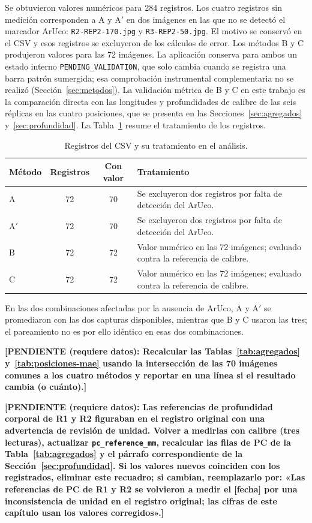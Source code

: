 \documentclass{report}
\newcommand{\Aprime}{A$'$}
\newcommand{\pendiente}[1]{\par\textbf{[PENDIENTE (requiere datos): #1]}\par}
\begin{document}
Se obtuvieron valores numéricos para 284 registros. Los cuatro registros sin medición corresponden a A y \Aprime{} en dos imágenes en las que no se detectó el marcador ArUco: \texttt{R2-REP2-170.jpg} y \texttt{R3-REP2-50.jpg}. El motivo se conservó en el CSV y esos registros se excluyeron de los cálculos de error. Los métodos B y C produjeron valores para las 72 imágenes. La aplicación conserva para ambos un estado interno \texttt{PENDING\_VALIDATION}, que solo cambia cuando se registra una barra patrón sumergida; esa comprobación instrumental complementaria no se realizó (Sección~\ref{sec:metodos}). La validación métrica de B y C en este trabajo es la comparación directa con las longitudes y profundidades de calibre de las seis réplicas en las cuatro posiciones, que se presenta en las Secciones~\ref{sec:agregados} y~\ref{sec:profundidad}. La Tabla~\ref{tab:registros} resume el tratamiento de los registros.

\begin{table}[htbp]

\caption{Registros del CSV y su tratamiento en el análisis.}
\label{tab:registros}
\begin{tabular}{@{}lccp{7.5cm}@{}}
\hline
Método & Registros & Con valor & Tratamiento \\
\hline
A & 72 & 70 & Se excluyeron dos registros por falta de detección del ArUco. \\
\Aprime & 72 & 70 & Se excluyeron dos registros por falta de detección del ArUco. \\
B & 72 & 72 & Valor numérico en las 72 imágenes; evaluado contra la referencia de calibre. \\
C & 72 & 72 & Valor numérico en las 72 imágenes; evaluado contra la referencia de calibre. \\
\hline
\end{tabular}
\end{table}

En las dos combinaciones afectadas por la ausencia de ArUco, A y \Aprime{} se promediaron con las dos capturas disponibles, mientras que B y C usaron las tres; el pareamiento no es por ello idéntico en esas dos combinaciones. \pendiente{Recalcular las Tablas~\ref{tab:agregados} y~\ref{tab:posiciones-mae} usando la intersección de las 70 imágenes comunes a los cuatro métodos y reportar en una línea si el resultado cambia (o cuánto).}

\pendiente{Las referencias de profundidad corporal de R1 y R2 figuraban en el registro original con una advertencia de revisión de unidad. Volver a medirlas con calibre (tres lecturas), actualizar \texttt{pc\_reference\_mm}, recalcular las filas de PC de la Tabla~\ref{tab:agregados} y el párrafo correspondiente de la Sección~\ref{sec:profundidad}. Si los valores nuevos coinciden con los registrados, eliminar este recuadro; si cambian, reemplazarlo por: «Las referencias de PC de R1 y R2 se volvieron a medir el [fecha] por una inconsistencia de unidad en el registro original; las cifras de este capítulo usan los valores corregidos».}
\end{document}
